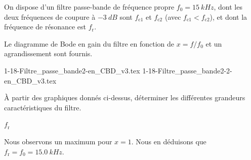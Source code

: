\newpage


\hauteurLargeurCadreReponse		{7mm}{2cm}
\initialisationEntrainement


On dispose d'un filtre passe-bande de fréquence propre $f_0=\SI{15}{kHz}$, dont les deux fréquences de coupure à $\SI{-3}{dB}$ sont $f_{\text{c1}}$ et $f_{\text{c2}}$ (avec $f_{\text{c1}} < f_{\text{c2}}$), et dont la fréquence de résonance est $f_{\text{r}}$.

Le diagramme de Bode en gain du filtre en fonction de $x = f/f_0$ et un agrandissement sont fournis.
\minusSmallskip
\begin{center}
	\def\factorScaleX{0.45}
	\def\factorScaleY{0.68}
	{1-18-Filtre_passe_bande2-en_CBD_v3.tex}
	{1-18-Filtre_passe_bande2-2-en_CBD_v3.tex}
\end{center}

À partir des graphiques donnés ci-dessus, déterminer les différentes grandeurs caractéristiques du filtre.

\debutEntrainement


\begin{enonce}
	$f_{\text{r}}$
\end{enonce}


\begin{corrige}
	Nous observons un maximum pour $x=1$. Nous en déduisons que $f_{\text{r}}=f_0=\SI{15.0}{kHz}$.
\end{corrige}

